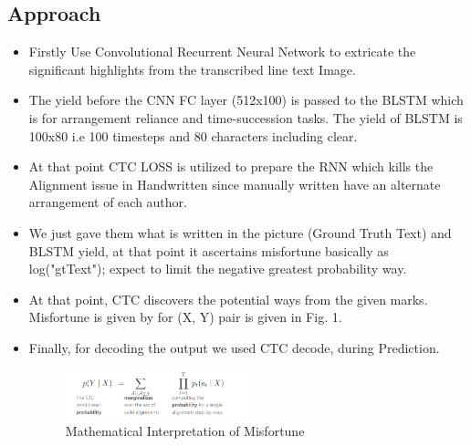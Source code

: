 \documentclass[12pt, conference]{IEEEtran}
\begin{document}
\subsection{\textbf{Approach}}
\begin{itemize}
    \item Firstly Use Convolutional Recurrent Neural Network to extricate the significant highlights from the transcribed line text Image.
    \item The yield before the CNN FC layer (512x100) is passed to the BLSTM which is for arrangement reliance and time-succession tasks. The yield of BLSTM is 100x80 i.e 100 timesteps and 80 characters including clear.
    \item At that point CTC LOSS is utilized to prepare the RNN which kills the Alignment issue in Handwritten since manually written have an alternate arrangement of each author.
    \item We just gave them what is written in the picture (Ground Truth Text) and BLSTM yield, at that point it ascertains misfortune basically as log("gtText"); expect to limit the negative greatest probability way.
    \item At that point, CTC discovers the potential ways from the given marks. Misfortune is given by for (X, Y) pair is given in Fig. 1.
    \item Finally, for decoding the output we used CTC decode, during Prediction.
    \begin{figure}[h]
        \centering
        \includegraphics[width=0.5\textwidth]{img1.jpg}
        \caption{Mathematical Interpretation of Misfortune}
    \end{figure}
\end{itemize}
\end{document}
